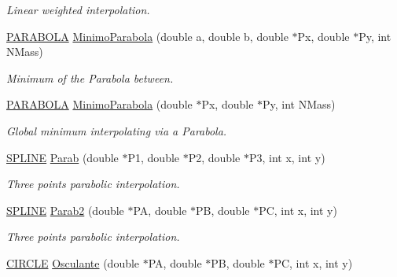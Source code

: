 \begin{DoxyCompactItemize}
\begin{DoxyCompactList}\small\item\em \-Linear weighted interpolation. \end{DoxyCompactList}\item 
\hyperlink{structPARABOLA}{\-P\-A\-R\-A\-B\-O\-L\-A} \hyperlink{classMatematica_a90a6e30254a3d26a422a173cdc46a823}{\-Minimo\-Parabola} (double a, double b, double $\ast$\-Px, double $\ast$\-Py, int \-N\-Mass)
\begin{DoxyCompactList}\small\item\em \-Minimum of the \-Parabola between. \end{DoxyCompactList}\item 
\hypertarget{classMatematica_a0e0bcc6fadb562dde7298fa8119e7c4d}{\hyperlink{structPARABOLA}{\-P\-A\-R\-A\-B\-O\-L\-A} \hyperlink{classMatematica_a0e0bcc6fadb562dde7298fa8119e7c4d}{\-Minimo\-Parabola} (double $\ast$\-Px, double $\ast$\-Py, int \-N\-Mass)}\label{classMatematica_a0e0bcc6fadb562dde7298fa8119e7c4d}

\begin{DoxyCompactList}\small\item\em \-Global minimum interpolating via a \-Parabola. \end{DoxyCompactList}\item 
\hypertarget{classMatematica_a0bf66137177a5078071d2da064fa3a72}{\hyperlink{structSPLINE}{\-S\-P\-L\-I\-N\-E} \hyperlink{classMatematica_a0bf66137177a5078071d2da064fa3a72}{\-Parab} (double $\ast$\-P1, double $\ast$\-P2, double $\ast$\-P3, int x, int y)}\label{classMatematica_a0bf66137177a5078071d2da064fa3a72}

\begin{DoxyCompactList}\small\item\em \-Three points parabolic interpolation. \end{DoxyCompactList}\item 
\hypertarget{classMatematica_a000dcbdd9b1b4f62dd4c4b2fc19ff300}{\hyperlink{structSPLINE}{\-S\-P\-L\-I\-N\-E} \hyperlink{classMatematica_a000dcbdd9b1b4f62dd4c4b2fc19ff300}{\-Parab2} (double $\ast$\-P\-A, double $\ast$\-P\-B, double $\ast$\-P\-C, int x, int y)}\label{classMatematica_a000dcbdd9b1b4f62dd4c4b2fc19ff300}

\begin{DoxyCompactList}\small\item\em \-Three points parabolic interpolation. \end{DoxyCompactList}\item 
\hypertarget{classMatematica_a40a33aaca86667162b5772e49e969d56}{\hyperlink{structCIRCLE}{\-C\-I\-R\-C\-L\-E} \hyperlink{classMatematica_a40a33aaca86667162b5772e49e969d56}{\-Osculante} (double $\ast$\-P\-A, double $\ast$\-P\-B, double $\ast$\-P\-C, int x, int y)}\label{classMatematica_a40a33aaca86667162b5772e49e969d56}


\end{DoxyCompactItemize}
